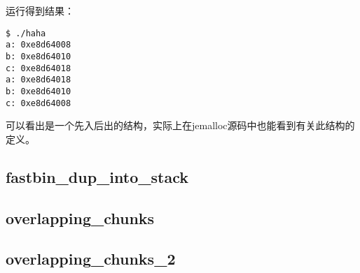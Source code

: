 运行得到结果：
\begin{verbatim}
$ ./haha       
a: 0xe8d64008
b: 0xe8d64010
c: 0xe8d64018
a: 0xe8d64018
b: 0xe8d64010
c: 0xe8d64008

\end{verbatim}

可以看出是一个先入后出的结构，实际上在jemalloc源码中也能看到有关此结构的定义。

\subsection{fastbin\_dup\_into\_stack}

\subsection{overlapping\_chunks}

\subsection{overlapping\_chunks\_2}

\newpage